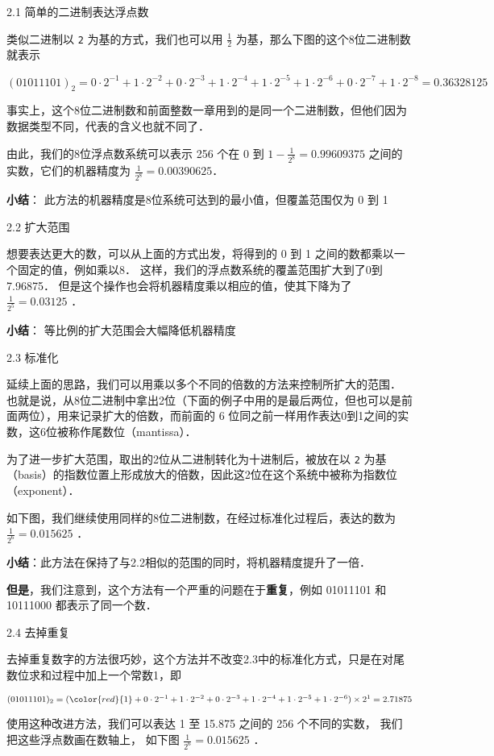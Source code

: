 2.1 简单的二进制表达浮点数

类似二进制以 \verb|2| 为基的方式，我们也可以用  $\frac{1}{2}$  为基，那么下图的这个8位二进制数就表示

 $(01011101)_2=0\cdot2^{-1}+1\cdot2^{-2}+0\cdot2^{-3}+1\cdot2^{-4}+1\cdot2^{-5}+1\cdot2^{-6}+0\cdot2^{-7}+1\cdot2^{-8}=0.36328125$  

事实上，这个8位二进制数和前面整数一章用到的是同一个二进制数，但他们因为数据类型不同，代表的含义也就不同了．

由此，我们的8位浮点数系统可以表示 256 个在 0 到  $1-\frac{1}{2^8}=0.99609375$  之间的实数，它们的机器精度为  $\frac{1}{2^8}=0.00390625$．

\textbf{小结}： 此方法的机器精度是8位系统可达到的最小值，但覆盖范围仅为 0 到 1

2.2 扩大范围

想要表达更大的数，可以从上面的方式出发，将得到的 0 到 1 之间的数都乘以一个固定的值，例如乘以8． 这样，我们的浮点数系统的覆盖范围扩大到了0到7.96875． 但是这个操作也会将机器精度乘以相应的值，使其下降为了  $\frac{1}{2^5}=0.03125$  ．

\textbf{小结}： 等比例的扩大范围会大幅降低机器精度

2.3 标准化

延续上面的思路，我们可以用乘以多个不同的倍数的方法来控制所扩大的范围． 也就是说，从8位二进制中拿出2位（下面的例子中用的是最后两位，但也可以是前面两位），用来记录扩大的倍数，而前面的 6 位同之前一样用作表达0到1之间的实数，这6位被称作尾数位（mantissa）． 

为了进一步扩大范围，取出的2位从二进制转化为十进制后，被放在以 \verb|2| 为基（basis）的指数位置上形成放大的倍数，因此这2位在这个系统中被称为指数位（exponent）．

如下图，我们继续使用同样的8位二进制数，在经过标准化过程后，表达的数为 $\frac{1}{2^6}=0.015625$  ．

\textbf{小结}：此方法在保持了与2.2相似的范围的同时，将机器精度提升了一倍．

\textbf{但是}，我们注意到，这个方法有一个严重的问题在于\textbf{重复}，例如 01011101 和 10111000 都表示了同一个数．

2.4 去掉重复

去掉重复数字的方法很巧妙，这个方法并不改变2.3中的标准化方式，只是在对尾数位求和过程中加上一个常数1，即

$(01011101)_2=({\color{red}{1}}+0\cdot2^{-1}+1\cdot2^{-2}+0\cdot2^{-3}+1\cdot2^{-4}+1\cdot2^{-5}+1\cdot2^{-6})\times2^1=2.71875$  

使用这种改进方法，我们可以表达 1 至 15.875 之间的 256 个不同的实数， 我们把这些浮点数画在数轴上， 如下图 $\frac{1}{2^6}=0.015625$  ．

